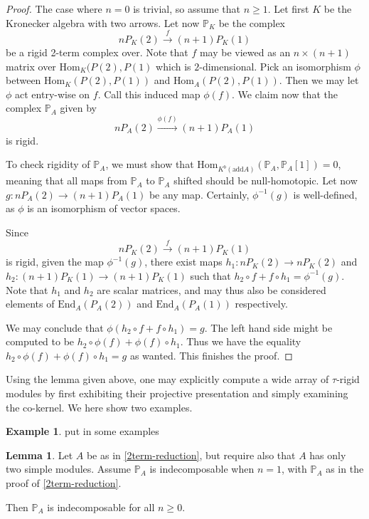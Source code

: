 \documentclass[]{article}
\theoremstyle{definition}
\newtheorem{lemma}{Lemma}[section]
\newtheorem{example}{Example}[section]
\newcommand{\tu}{\ensuremath{\tau}}
\begin{document}
\begin{proof}
	The case where $n = 0$ is trivial, so assume that $n \geq 1$. Let first $K$ be the Kronecker algebra with two arrows. Let now $\mathbb{P}_K $ be the complex \[nP_K(2) \xrightarrow{f} (n+1)P_K(1)\] be a rigid 2-term complex over. Note that $f$ may be viewed as an $n\times(n+1)$ matrix over $\text{Hom}_K(P(2),P(1)$ which is $2$-dimensional. Pick an isomorphism $\phi$ between $\text{Hom}_K(P(2),P(1))$ and $\text{Hom}_A(P(2),P(1))$. Then we may let $\phi$ act entry-wise on $f$. Call this induced map $\phi(f)$. We claim now that the complex $\mathbb{P}_A$ given by  \[nP_A(2) \xrightarrow{\phi(f)} (n+1)P_A(1)\] is rigid.
	
	To check rigidity of $\mathbb{P}_A$, we must show that $\text{Hom}_{K^b(\text{add} A)}(\mathbb{P}_A,\mathbb{P}_A[1]) = 0$, meaning that all maps from $\mathbb{P}_A$ to $\mathbb{P}_A$ shifted should be null-homotopic. Let now $g:nP_A(2) \to (n+1)P_A(1)$ be any map. Certainly, $\phi^{-1}(g)$ is well-defined, as $\phi$ is an isomorphism of vector spaces.
	
	Since \[nP_K(2) \xrightarrow{f} (n+1)P_K(1)\] is rigid, given the map $\phi^{-1}(g)$, there exist maps $h_1:nP_K(2) \to nP_K(2)$ and $h_2:(n+1)P_K(1) \to (n+1)P_K(1)$ such that $h_2\circ f + f \circ h_1 = \phi^{-1}(g)$. Note that $h_1$ and $h_2$ are scalar matrices, and may thus also be considered elements of $\text{End}_A(P_A(2))$ and $\text{End}_A(P_A(1))$ respectively.
	
	We may conclude that $\phi(h_2\circ f + f \circ h_1) = g$. The left hand side might be computed to be $h_2 \circ \phi(f) + \phi(f) \circ h_1$. Thus we have the equality $h_2 \circ \phi(f) + \phi(f) \circ h_1 = g$ as wanted. This finishes the proof.
	

	
\end{proof}

Using the lemma given above, one may explicitly compute a wide array of \tu-rigid modules by first exhibiting their projective presentation and simply examining the co-kernel. We here show two examples.

\begin{example}
	
	put in some examples
	
\end{example}

\begin{lemma}
	Let $A$ be as in \cref{2term-reduction}, but require also that $A$ has only two simple modules. Assume $\mathbb{P}_A$ is indecomposable when $n = 1$, with $\mathbb{P}_A$ as in the proof of \cref{2term-reduction}. 
	
	Then $\mathbb{P}_A$ is indecomposable for all $n \geq 0$.
\end{lemma}
\end{document}
